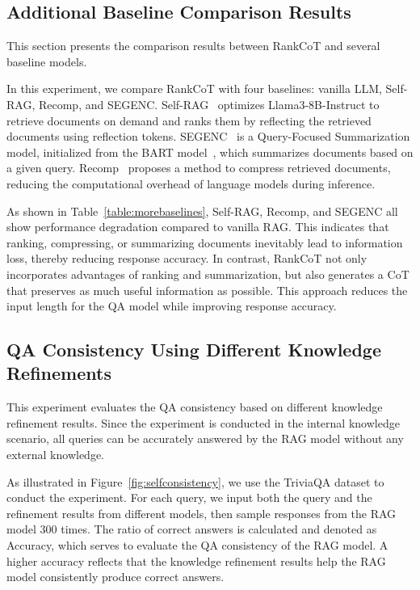 \subsection{Additional Baseline Comparison Results}\label{appendix: more_baseline}
This section presents the comparison results between RankCoT and several baseline models. 

In this experiment, we compare RankCoT with four baselines: vanilla LLM, Self-RAG, Recomp, and SEGENC. Self-RAG~\citep{asai2024selfrag} optimizes Llama3-8B-Instruct to retrieve documents on demand and ranks them by reflecting the retrieved documents using reflection tokens. SEGENC~\cite{vig2021exploring} is a Query-Focused Summarization model, initialized from the BART model~\cite{lewis-etal-2020-bart}, which summarizes documents based on a given query. Recomp~\cite{xu2024recomp} proposes a method to compress retrieved documents, reducing the computational overhead of language models during inference.

As shown in Table~\ref{table:morebaselines}, Self-RAG, Recomp, and SEGENC all show performance degradation compared to vanilla RAG. This indicates that ranking, compressing, or summarizing documents inevitably lead to information loss, thereby reducing response accuracy. In contrast, RankCoT not only incorporates advantages of ranking and summarization, but also generates a CoT that preserves as much useful information as possible. This approach reduces the input length for the QA model while improving response accuracy.




\subsection{QA Consistency Using Different Knowledge Refinements}\label{appendix:selfconsistency}
This experiment evaluates the QA consistency based on different knowledge refinement results. Since the experiment is conducted in the internal knowledge scenario, all queries can be accurately answered by the RAG model without any external knowledge. 

As illustrated in Figure~\ref{fig:selfconsistency}, we use the TriviaQA dataset to conduct the experiment. For each query, we input both the query and the refinement results from different models, then sample responses from the RAG model 300 times. The ratio of correct answers is calculated and denoted as Accuracy, which serves to evaluate the QA consistency of the RAG model. A higher accuracy reflects that the knowledge refinement results help the RAG model consistently produce correct answers. 

